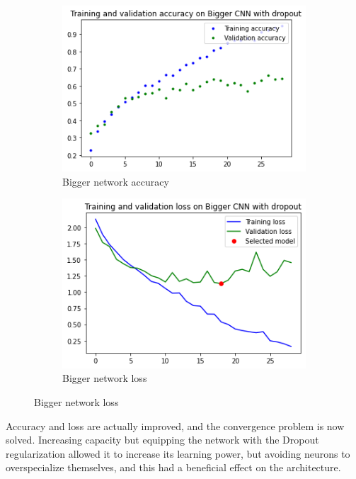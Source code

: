 \begin{figure}[H]
	\begin{subfigure}{0.5\textwidth}
		\includegraphics[width=0.9\linewidth]{img/scratch/bigger_acc.png} 
		\caption{Bigger network accuracy}
		\label{fig:BiggerCNNacc}
	\end{subfigure}
	\begin{subfigure}{0.5\textwidth}
		\includegraphics[width=0.9\linewidth]{img/scratch/bigger_loss.png}
		\caption{Bigger network loss}
		\label{fig:BiggerCNNloss}
	\end{subfigure}
\end{figure}

\medskip

\noindent Accuracy and loss are actually improved, and the convergence problem is now solved. Increasing capacity but equipping the network with the Dropout regularization allowed it to increase its learning power, but avoiding neurons to overspecialize themselves, and this had a beneficial effect on the architecture.

